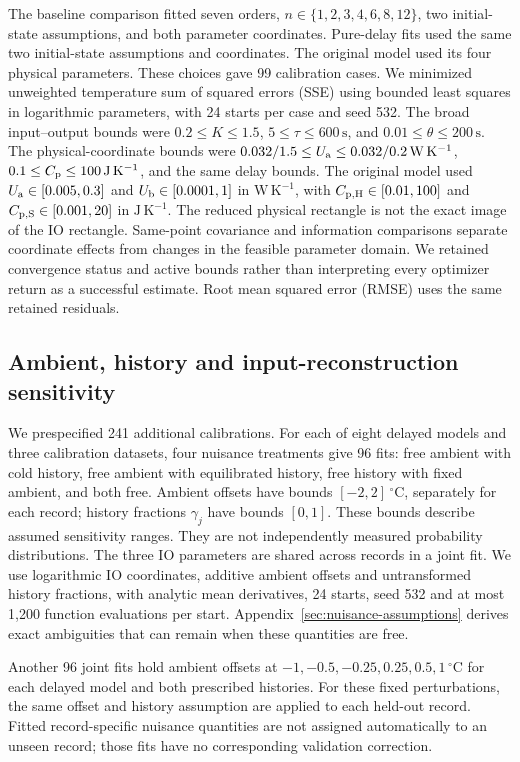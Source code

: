 The baseline comparison fitted seven orders, $n\in\{1,2,3,4,6,8,12\}$, two
initial-state assumptions, and both parameter coordinates. Pure-delay fits used
the same two initial-state assumptions and coordinates. The original model used
its four physical parameters. These choices gave 99 calibration cases.
We minimized unweighted temperature sum of squared errors (SSE) using bounded
least squares in logarithmic parameters, with 24 starts per case and seed 532.
The broad input--output bounds were $0.2\leq K\leq1.5$,
$5\leq\tau\leq600\,\mathrm{s}$, and
$0.01\leq\theta\leq200\,\mathrm{s}$. The physical-coordinate bounds were
$0.032/1.5\leq U_{\mathrm a}\leq0.032/0.2\,\mathrm{W\,K^{-1}}$,
$0.1\leq C_{\mathrm p}\leq100\,\mathrm{J\,K^{-1}}$, and the same delay bounds.
The original model used $U_{\mathrm a}\in[0.005,0.3]$ and
$U_{\mathrm b}\in[0.0001,1]$ in $\mathrm{W\,K^{-1}}$, with
$C_{\mathrm{p,H}}\in[0.01,100]$ and $C_{\mathrm{p,S}}\in[0.001,20]$ in
$\mathrm{J\,K^{-1}}$. The reduced physical rectangle is not the exact image
of the IO rectangle. Same-point covariance and information comparisons separate
coordinate effects from changes in the feasible parameter domain.
We retained convergence status and active bounds rather than interpreting every
optimizer return as a successful estimate.
Root mean squared error (RMSE) uses the same retained residuals.

\subsection{Ambient, history and input-reconstruction sensitivity}
We prespecified 241 additional calibrations. For each of eight delayed models
and three calibration datasets, four nuisance treatments give 96 fits:
free ambient with cold history, free ambient with equilibrated history,
free history with fixed ambient, and both free. Ambient offsets have bounds
$[-2,2]\,{}^\circ\mathrm C$, separately for each record; history fractions $\gamma_j$
have bounds $[0,1]$. These bounds describe assumed sensitivity ranges.
They are not independently measured probability distributions. The three
IO parameters are shared across records in a joint fit. We use logarithmic
IO coordinates, additive ambient offsets and untransformed history fractions,
with analytic mean derivatives, 24 starts, seed 532 and at most 1,200 function
evaluations per start. Appendix~\ref{sec:nuisance-assumptions} derives exact
ambiguities that can remain when these quantities are free.

Another 96 joint fits hold ambient offsets at
$-1,-0.5,-0.25,0.25,0.5,1\,{}^\circ\mathrm C$ for each delayed model and
both prescribed histories. For these fixed perturbations, the same offset
and history assumption are applied to each held-out record. Fitted
record-specific nuisance quantities are not assigned automatically to an unseen
record; those fits have no corresponding validation correction.


